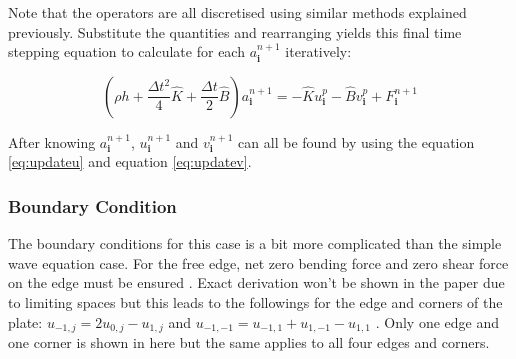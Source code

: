 Note that the operators are all discretised using similar methods explained previously. Substitute the quantities and rearranging yields this final time stepping equation to calculate for each $a^{n+1}_{\mathbf{i}}$ iteratively:

\begin{equation}
    (\rho h + \frac{\Delta t^2}{4} \hat{K} + \frac{\Delta t}{2} \hat{B}) a^{n+1}_{\mathbf{i}} = -\hat{K}u^{p}_{\mathbf{i}} - \hat{B}v^{p}_{\mathbf{i}}+F^{n+1}_{\mathbf{i}}
\end{equation}

After knowing $a^{n+1}_{\mathbf{i}}$, $u^{n+1}_{\mathbf{i}}$ and $v^{n+1}_{\mathbf{i}}$ can all be found by using the equation \eqref{eq:updateu} and equation \eqref{eq:updatev}. 

\subsubsection{Boundary Condition}
The boundary conditions for this case is a bit more complicated than the simple wave equation case. For the free edge, net zero bending force and zero shear force on the edge must be ensured \autocite{kirchhoff1850scheibe} \autocite{timoshenko1959plates}. Exact derivation won't be shown in the paper due to limiting spaces but this leads to the followings for the edge and corners of the plate: $u_{-1,j} = 2u_{0,j} - u_{1,j}$ and $u_{-1,-1} = u_{-1,1} + u_{1,-1} - u_{1,1}$ \autocite{nguyen2021kirchhofflove}. Only one edge and one corner is shown in here but the same applies to all four edges and corners.